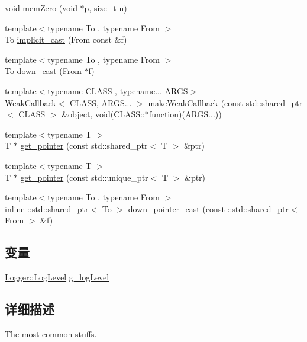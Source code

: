 \begin{DoxyCompactItemize}
\item 
void \hyperlink{namespacemuduo_a8f6d784bddb9d3e0774a665b147758bc}{mem\+Zero} (void $\ast$p, size\+\_\+t n)
\item 
{\footnotesize template$<$typename To , typename From $>$ }\\To \hyperlink{namespacemuduo_a72cbcf425db108335295456e8ff9c12b}{implicit\+\_\+cast} (From const \&f)
\item 
{\footnotesize template$<$typename To , typename From $>$ }\\To \hyperlink{namespacemuduo_a4a5610d86660bbd28e059ebb1ffc8316}{down\+\_\+cast} (From $\ast$f)
\item 
{\footnotesize template$<$typename C\+L\+A\+SS , typename... A\+R\+GS$>$ }\\\hyperlink{classmuduo_1_1WeakCallback}{Weak\+Callback}$<$ C\+L\+A\+SS, A\+R\+G\+S... $>$ \hyperlink{namespacemuduo_ae9dd2c7476408fd8f17491aff0d422f1}{make\+Weak\+Callback} (const std\+::shared\+\_\+ptr$<$ C\+L\+A\+SS $>$ \&object, void(C\+L\+A\+S\+S\+::$\ast$function)(A\+R\+G\+S...))
\item 
{\footnotesize template$<$typename T $>$ }\\T $\ast$ \hyperlink{namespacemuduo_a98789775449e36c3c0c26004e19ef6bc}{get\+\_\+pointer} (const std\+::shared\+\_\+ptr$<$ T $>$ \&ptr)
\item 
{\footnotesize template$<$typename T $>$ }\\T $\ast$ \hyperlink{namespacemuduo_aedcb2cb9b3d8f7bdfabeadec584a691c}{get\+\_\+pointer} (const std\+::unique\+\_\+ptr$<$ T $>$ \&ptr)
\item 
{\footnotesize template$<$typename To , typename From $>$ }\\inline \+::std\+::shared\+\_\+ptr$<$ To $>$ \hyperlink{namespacemuduo_a1836aa0a42711172d5598fbfda6fb588}{down\+\_\+pointer\+\_\+cast} (const \+::std\+::shared\+\_\+ptr$<$ From $>$ \&f)
\end{DoxyCompactItemize}
\subsection*{变量}
\begin{DoxyCompactItemize}
\item 
\hyperlink{classmuduo_1_1Logger_aca1fd1d8935433e6ba2e3918214e07f9}{Logger\+::\+Log\+Level} \hyperlink{namespacemuduo_ac758fb9f0d1703994b7e23772d09f183}{g\+\_\+log\+Level}
\end{DoxyCompactItemize}


\subsection{详细描述}
The most common stuffs. 

